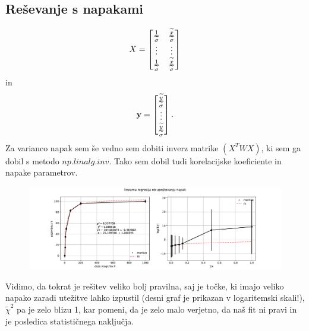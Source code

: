 \documentclass[11pt, a4paper]{article}
\renewcommand{\vec}[1]{\mathbf{#1}}
\begin{document}
\subsection{Reševanje s napakami}
\[
X=
  \begin{bmatrix}
    \frac{1}{\widetilde{\sigma}} & \frac{\widetilde{x}}{\widetilde{\sigma}} \\
    \vdotswithin{...} & \vdotswithin{...}         \\
    \frac{1}{\widetilde{\sigma}} & \frac{\widetilde{x}}{\widetilde{\sigma}} \\
  \end{bmatrix}
\]
in 
\[
\vec{y} = 
	\begin{bmatrix}
	\frac{\widetilde{y}}{\widetilde{\sigma}}\\
	\vdotswithin{}		\\
	\frac{\widetilde{y}}{\widetilde{\sigma}}\\
	\end{bmatrix}.
\]
Za varianco napak sem še vedno sem dobiti inverz matrike $(X^TWX)$, ki sem ga dobil s metodo $np.linalg.inv$. Tako sem dobil tudi korelacijske koeficiente in napake parametrov.
\begin{figure}[H]
\hspace*{-2.8cm}     
  \includegraphics[width=23cm]{prva_upostevanje_napak.pdf}
 
\end{figure}
Vidimo, da tokrat je rešitev veliko bolj pravilna, saj je točke, ki imajo veliko napako zaradi utežitve lahko izpustil (desni graf je prikazan v logaritemski skali!), $\widetilde{\chi}^2$ pa je zelo blizu 1, kar pomeni, da je zelo malo verjetno, da naš fit ni pravi in je posledica statističnega naključja.
\end{document}

